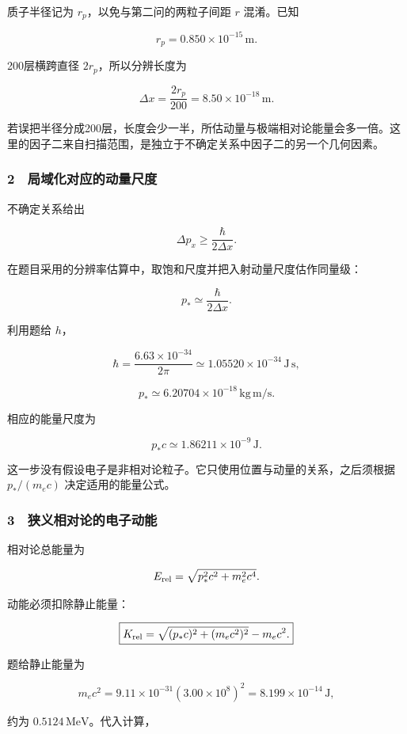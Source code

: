 \documentclass[12pt,a4paper,fontset=fandol]{ctexart}
\begin{document}
质子半径记为 \(r_p\)，以免与第二问的两粒子间距 \(r\) 混淆。已知

\[r_p=0.850\times10^{-15}\,\mathrm m.\]

200层横跨直径 \(2r_p\)，所以分辨长度为

\[\boxed{\Delta x=\frac{2r_p}{200}
=8.50\times10^{-18}\,\mathrm m.}\]

若误把半径分成200层，长度会少一半，所估动量与极端相对论能量会多一倍。这里的因子二来自扫描范围，是独立于不确定关系中因子二的另一个几何因素。

\subsubsection{2　局域化对应的动量尺度}\label{ux5c40ux57dfux5316ux5bf9ux5e94ux7684ux52a8ux91cfux5c3aux5ea6}

不确定关系给出

\[\Delta p_x\ge\frac\hbar{2\Delta x}.\]

在题目采用的分辨率估算中，取饱和尺度并把入射动量尺度估作同量级：

\[\boxed{p_*\simeq\frac\hbar{2\Delta x}.}\]

利用题给 \(h\)，

\[\hbar=\frac{6.63\times10^{-34}}{2\pi}
\simeq1.05520\times10^{-34}\,\mathrm{J\,s},\]

\[p_*\simeq6.20704\times10^{-18}\,\mathrm{kg\,m/s}.\]

相应的能量尺度为

\[\boxed{p_*c\simeq1.86211\times10^{-9}\,\mathrm J.}\]

这一步没有假设电子是非相对论粒子。它只使用位置与动量的关系，之后须根据
\(p_*/(m_ec)\) 决定适用的能量公式。

\subsubsection{3　狭义相对论的电子动能}\label{ux72edux4e49ux76f8ux5bf9ux8bbaux7684ux7535ux5b50ux52a8ux80fd}

相对论总能量为

\[E_{\rm rel}=\sqrt{p_*^2c^2+m_e^2c^4}.\]

动能必须扣除静止能量：

\[\boxed{K_{\rm rel}
=\sqrt{(p_*c)^2+(m_ec^2)^2}-m_ec^2.}\]

题给静止能量为

\[m_ec^2=9.11\times10^{-31}(3.00\times10^8)^2
=8.199\times10^{-14}\,\mathrm J,\]

约为 \(0.5124\,\mathrm{MeV}\)。代入计算，
\end{document}
